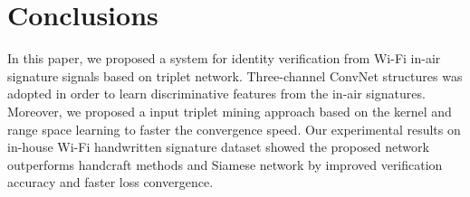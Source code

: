 \label{chp:Conclusions}
\section{Conclusions}
In this paper, we proposed a system for identity verification from Wi-Fi in-air signature signals based on triplet network. Three-channel ConvNet structures was adopted in order to learn discriminative features from the in-air signatures. Moreover, we proposed a input triplet mining approach based on the kernel and range space learning to faster the convergence speed.
Our experimental results on in-house Wi-Fi handwritten signature dataset showed the proposed network outperforms handcraft methods and Siamese network by improved verification accuracy and faster loss convergence.
\iffalse
\section{Future Works}
\begin{enumerate}
	\setlength{\itemsep}{1pt}
	\item Recognizing the in-air signature written along non-LOS. 
	\item Repeating the same data acquisition experiments in a different place
	\item Studying identification performances when multiple people are staying in the same room.
	\item To secure a reliable identification system, spoofing attack scenario should be investigated. 
\end{enumerate} 
\fi